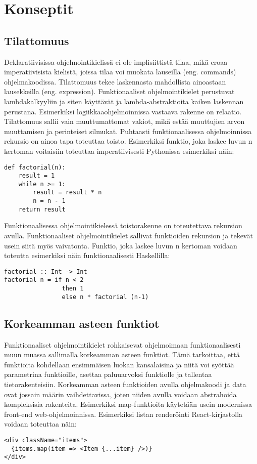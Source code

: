 
\section{Konseptit}

\subsection{Tilattomuus}
Deklaratiivisissa ohjelmointikielissä ei ole implisiittistä tilaa, mikä eroaa imperatiivisista kielistä, joissa tilaa
voi muokata lauseilla (eng. commands) ohjelmakoodissa. Tilattomuus tekee laskennasta mahdollista ainoastaan lausekkeilla
(eng. expression). Funktionaaliset ohjelmointikielet perustuvat lambdakalkyyliin ja siten käyttävät ja 
lambda-abstraktioita kaiken laskennan perustana. Esimerkiksi logiikkaaohjelmoinnissa vastaava rakenne on relaatio.
Tilattomuus sallii vain muuttumattomat vakiot, mikä estää muuttujien arvon muuttamisen ja perinteiset silmukat.
Puhtaasti funktionaalisessa ohjelmoinnissa rekursio on ainoa tapa toteuttaa toisto. Esimerkiksi funktio, joka laskee
luvun n kertoman voitaisiin toteuttaa imperatiivisesti Pythonissa esimerkiksi näin:
\begin{verbatim}
def factorial(n):
    result = 1
    while n >= 1:
        result = result * n
        n = n - 1
    return result
\end{verbatim}
Funktionaalisessa ohjelmointikielessä toistorakenne on toteutettava rekursion avulla. Funktionaaliset ohjelmointikielet
sallivat funktioiden rekursion ja tekevät usein siitä myös vaivatonta.\cite{hudak} Funktio, joka laskee luvun n kertoman
voidaan toteutta esimerkiksi näin funktionaalisesti Haskellilla:
\begin{verbatim}
factorial :: Int -> Int
factorial n = if n < 2
                then 1
                else n * factorial (n-1)
\end{verbatim}

\subsection{Korkeamman asteen funktiot}
Funktionaaliset ohjelmointikielet rohkaisevat ohjelmoimaan funktionaalisesti muun muassa sallimalla korkeamman asteen
funktiot. Tämä tarkoittaa, että funktioita kohdellaan ensimmäisen luokan kansalaisina ja niitä voi syöttää parametrina
funktioille, asettaa paluuarvoksi funktiolle ja tallentaa tietorakenteisiin. Korkeamman asteen funktioiden avulla
ohjelmakoodi ja data ovat jossain määrin vaihdettavissa, joten niiden avulla voidaan abstrahoida kompleksisia
rakenteita.\cite{hudak} Esimerkiksi map-funktioita käytetään usein modernissa front-end
web-ohjelmoinnissa\cite{functionalreact}. Esimerkiksi listan renderöinti React-kirjastolla voidaan toteuttaa näin:
\begin{verbatim}
<div className="items">
  {items.map(item => <Item {...item} />)}
</div>
\end{verbatim}

